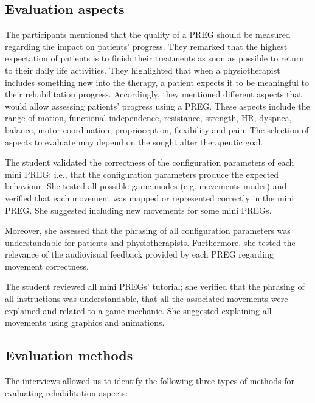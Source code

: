 \subsection{Evaluation aspects}
\label{sec:rehab_aspects}
The participants mentioned that the quality of a \ac{PREG} should be measured regarding the impact on patients' progress. They remarked that the highest expectation of patients is to finish their treatments as soon as possible to return to their daily life activities. They highlighted that when a physiotherapist includes something new into the therapy, a patient expects it to be meaningful to their rehabilitation progress. Accordingly, they mentioned different aspects that would allow assessing patients' progress using a \ac{PREG}. These aspects include the range of motion, functional independence, resistance, strength, \ac{HR}, dyspnea, balance, motor coordination, proprioception, flexibility and pain. The selection of aspects to evaluate may depend on the sought after therapeutic goal.

The student validated the correctness of the configuration parameters of each mini \ac{PREG}; i.e., that the configuration parameters produce the expected behaviour. She tested all possible game modes (e.g. movements modes) and verified that each movement was mapped or represented correctly in the mini \ac{PREG}. She suggested including new movements for some mini \acp{PREG}.

Moreover, she assessed that the phrasing of all configuration parameters was understandable for patients and physiotherapists. Furthermore, she tested the relevance of the audiovisual feedback provided by each \ac{PREG} regarding movement correctness.

The student reviewed all mini \acp{PREG}' tutorial; she verified that the phrasing of all instructions was understandable, that all the associated movements were explained and related to a game mechanic. She suggested explaining all movements using graphics and animations.

\subsection{Evaluation methods}
\label{sec:rehab_methods}
The interviews allowed us to identify the following three types of methods for evaluating rehabilitation aspects:

